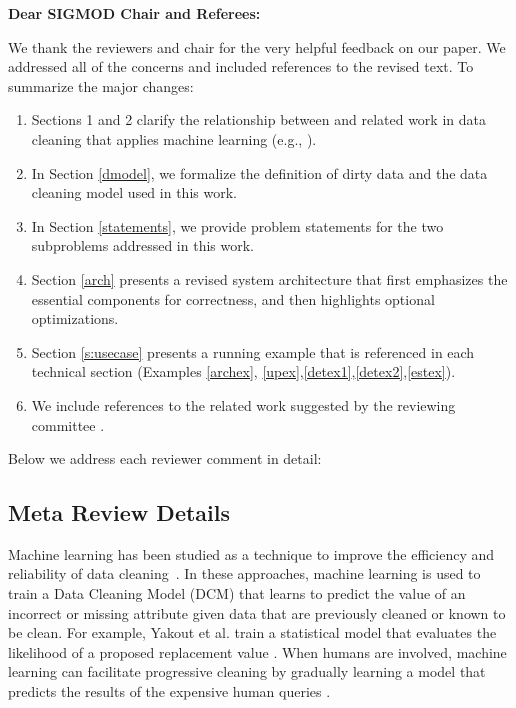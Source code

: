 {\noindent \normalsize \bf Dear SIGMOD Chair and Referees: }

\vspace{.5em}

We thank the reviewers and chair for the very helpful feedback on our paper. 
We addressed all of the concerns and included references to the revised text. 
To summarize the major changes:

\begin{enumerate}
\item Sections 1 and 2 clarify the relationship between \sys and related work in data cleaning that applies machine learning (e.g., \cite{gokhale2014corleone, DBLP:journals/pvldb/YakoutENOI11, yakout2013don}).

\item In Section \ref{dmodel}, we formalize the definition of dirty data and the data cleaning model used in this work.

\item In Section \ref{statements}, we provide problem statements for the two subproblems addressed in this work.

\item Section \ref{arch} presents a revised system architecture that first emphasizes the essential components for correctness, and then highlights optional optimizations. 

\item Section \ref{s:usecase} presents a running example that is referenced in each technical section (Examples \ref{archex}, \ref{upex},\ref{detex1},\ref{detex2},\ref{estex}).

\item We include references to the related work suggested by the reviewing committee \cite{whang2014incremental, papenbrock2015progressive, gruenheid2014incremental, DBLP:journals/pvldb/YakoutENOI11, yakout2013don, heise2014estimating}.

\end{enumerate}
Below we address each reviewer comment in detail:

\vspace{0.5em}

\subsection*{Meta Review Details} 
Machine learning has been studied as a technique to improve the efficiency and reliability of data cleaning~\cite{yakout2013don,gokhale2014corleone}.
In these approaches, machine learning is used to train a Data Cleaning Model (DCM) that learns to predict the value of an incorrect or missing attribute given data that are previously cleaned or known to be clean.
For example, Yakout et al. train a statistical model that evaluates the likelihood of a proposed replacement value \cite{yakout2013don}.
When humans are involved, machine learning can facilitate progressive cleaning by gradually learning a model that predicts the results of the expensive human queries \cite{gokhale2014corleone, DBLP:journals/pvldb/MozafariSFJM14, DBLP:journals/pvldb/YakoutENOI11}.

